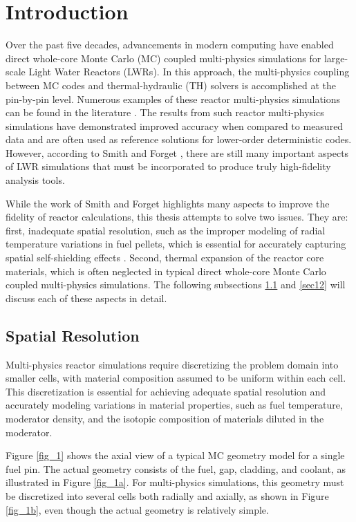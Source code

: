 \section{Introduction} \label{s1}

Over the past five decades, advancements in modern computing have enabled direct whole-core Monte Carlo (MC) coupled multi-physics simulations for large-scale Light Water Reactors (LWRs). In this approach, the multi-physics coupling between MC codes and thermal-hydraulic (TH) solvers is accomplished at the pin-by-pin level. Numerous examples of these reactor multi-physics simulations can be found in the literature \cite{tung_2020,kelly_2017,ma_2019}. The results from such reactor multi-physics simulations have demonstrated improved accuracy when compared to measured data and are often used as reference solutions for lower-order deterministic codes. However, according to Smith and Forget \cite{smith_2013}, there are still many important aspects of LWR simulations that must be incorporated to produce truly high-fidelity analysis tools.

While the work of Smith and Forget highlights many aspects to improve the fidelity of reactor calculations, this thesis attempts to solve two issues. They are: first, inadequate spatial resolution, such as the improper modeling of radial temperature variations in fuel pellets, which is essential for accurately capturing spatial self-shielding effects \cite{smith_2013, nchoi_2020}. Second, thermal expansion of the reactor core materials, which is often neglected in typical direct whole-core Monte Carlo coupled multi-physics simulations. The following subsections \ref{sec11} and \ref{sec12} will discuss each of these aspects in detail.

\subsection{Spatial Resolution} \label{sec11}

Multi-physics reactor simulations require discretizing the problem domain into smaller cells, with material composition assumed to be uniform within each cell. This discretization is essential for achieving adequate spatial resolution and accurately modeling variations in material properties, such as fuel temperature, moderator density, and the isotopic composition of materials diluted in the moderator.

Figure \ref{fig_1} shows the axial view of a typical MC geometry model for a single fuel pin. The actual geometry consists of the fuel, gap, cladding, and coolant, as illustrated in Figure \ref{fig_1a}. For multi-physics simulations, this geometry must be discretized into several cells both radially and axially, as shown in Figure \ref{fig_1b}, even though the actual geometry is relatively simple.

